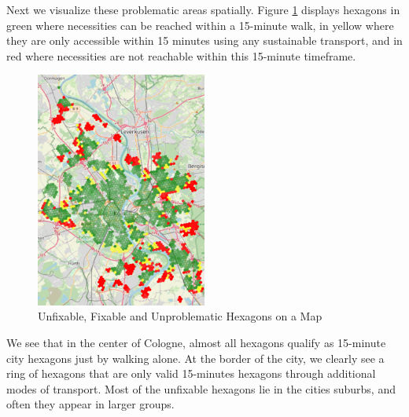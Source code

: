 Next we visualize these problematic areas spatially.
Figure \ref{fig:problematic_hexagons} displays hexagons in green where necessities can be reached within a 15-minute walk, in yellow where they are only accessible within 15 minutes using any sustainable transport, and in red where necessities are not reachable within this 15-minute timeframe.
\begin{figure}
  \begin{center}
    \includegraphics[width=0.50\textwidth]{Figures/results/problematic_hexagons/problematic_hexagons}
  \end{center}
  \caption{Unfixable, Fixable and Unproblematic Hexagons on a Map}
  \label{fig:problematic_hexagons}
\end{figure}
We see that in the center of Cologne, almost all hexagons qualify as 15-minute city hexagons just by walking alone.
At the border of the city, we clearly see a ring of hexagons that are only valid 15-minutes hexagons through additional modes of transport.
Most of the unfixable hexagons lie in the cities suburbs, and often they appear in larger groups.

